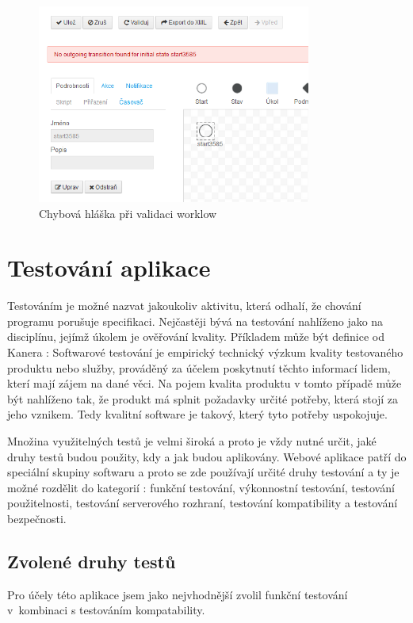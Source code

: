 \documentclass{fithesis}
\begin{document}
\begin{figure}[htp]
\centering
\includegraphics[width=340px]{images/error_message.png}
\caption{Chybová hláška při validaci worklow}
\label{fig:error}
\end{figure}





\chapter{Testování aplikace}
Testováním je možné nazvat jakoukoliv aktivitu, která odhalí, že chování programu porušuje specifikaci. Nejčastěji bývá na testování nahlíženo jako na disciplínu, jejímž úkolem je ověřování kvality. Příkladem může být definice od Kanera \cite{kaner}: Softwarové testování je empirický technický výzkum kvality testovaného produktu nebo služby, prováděný za účelem poskytnutí těchto informací lidem, kterí mají zájem na dané věci. Na pojem kvalita produktu v tomto případě může být nahlíženo tak, že produkt má splnit požadavky určité potřeby, která stojí za jeho vznikem. Tedy kvalitní software je takový, který tyto potřeby uspokojuje.

Množina využitelných testů je velmi široká a proto je vždy nutné určit, jaké druhy testů budou použity, kdy a jak budou aplikovány. Webové aplikace patří do speciální skupiny softwaru a proto se zde používají určité druhy testování a ty je možné rozdělit do kategorií \cite{web-test}:  funkční testování, výkonnostní testování, testování použitelnosti, testování serverového rozhraní, testování kompatibility a testování bezpečnosti.

\section{Zvolené druhy testů}
Pro účely této aplikace jsem jako nejvhodnější zvolil funkční testování v~kombinaci s testováním kompatability.
\end{document}
